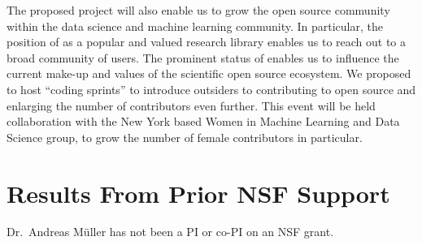 The proposed project will also enable us to grow the open source community
within the data science and machine learning community.  In particular, the
position of \sklearn{} as a popular and valued research library enables us to
reach out to a broad community of users.  The prominent status of \sklearn{}
enables us to influence the current make-up and values of the scientific open
source ecosystem.  We proposed to host ``coding sprints'' to introduce
outsiders to contributing to open source and enlarging the number of
contributors even further. This event will be held collaboration with the New
York based Women in Machine Learning and Data Science group, to grow the number
of female contributors in particular. 


\section{Results From Prior NSF Support}
Dr.\ Andreas M\"uller has not been a PI or co-PI on an NSF grant.
